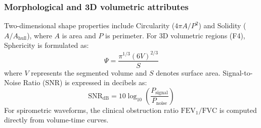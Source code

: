 \subsubsection{Morphological and 3D volumetric attributes}
Two-dimensional shape properties include Circularity ($4\pi A / P^2$) and Solidity ($A / A_{\text{hull}}$), where $A$ is area and $P$ is perimeter. For 3D volumetric regions (F4), Sphericity is formulated as:
\begin{equation}
\Psi = \frac{\pi^{1/3}(6V)^{2/3}}{S}
\end{equation}
where $V$ represents the segmented volume and $S$ denotes surface area. Signal-to-Noise Ratio (SNR) is expressed in decibels as:
\begin{equation}
\mathrm{SNR}_{\text{dB}} = 10 \log_{10}\left(\frac{P_{\text{signal}}}{P_{\text{noise}}}\right)
\end{equation}
For spirometric waveforms, the clinical obstruction ratio $\text{FEV}_1/\text{FVC}$ is computed directly from volume-time curves.
